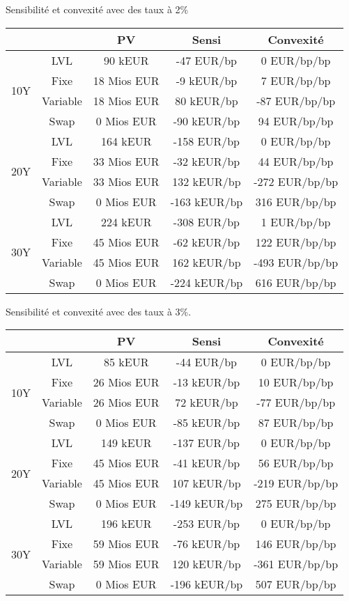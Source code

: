 \documentclass{beamer}
\begin{document}
\begin{frame}{Sensibilité et convexité avec des taux à 2\%}
\small
\begin{tabular}{|c|c|c|c|c|}
\hline
&&PV&Sensi&Convexité  \\ 
\hline
\multirow{4}{*}{10Y}&LVL& 90 kEUR &  -47 EUR/bp & 0 EUR/bp/bp \\ 
&Fixe& 18 Mios EUR &  -9 kEUR/bp & 7 EUR/bp/bp \\ 
&Variable& 18 Mios EUR & 80 kEUR/bp & -87 EUR/bp/bp \\ 
&Swap& 0 Mios EUR & -90 kEUR/bp & 94 EUR/bp/bp \\ 
\hline
\multirow{4}{*}{20Y}&LVL& 164 kEUR &  -158 EUR/bp & 0 EUR/bp/bp \\ 
&Fixe& 33 Mios EUR &  -32 kEUR/bp & 44 EUR/bp/bp \\ 
&Variable& 33 Mios EUR & 132 kEUR/bp & -272 EUR/bp/bp \\ 
&Swap& 0 Mios EUR & -163 kEUR/bp & 316 EUR/bp/bp \\ 
\hline
\multirow{4}{*}{30Y}&LVL& 224 kEUR &  -308 EUR/bp & 1 EUR/bp/bp \\ 
&Fixe& 45 Mios EUR &  -62 kEUR/bp & 122 EUR/bp/bp \\ 
&Variable& 45 Mios EUR & 162 kEUR/bp & -493 EUR/bp/bp \\ 
&Swap& 0 Mios EUR & -224 kEUR/bp & 616 EUR/bp/bp \\ 
\hline
\end{tabular}
\normalsize
\end{frame}

\begin{frame}{Sensibilité et convexité avec des taux  à 3\%.}
\small 
\begin{tabular}{|c|c|c|c|c|}
\hline
&&PV&Sensi&Convexité  \\ 
\hline
\multirow{4}{*}{10Y}&LVL& 85 kEUR &  -44 EUR/bp & 0 EUR/bp/bp \\ 
&Fixe& 26 Mios EUR &  -13 kEUR/bp & 10 EUR/bp/bp \\ 
&Variable& 26 Mios EUR & 72 kEUR/bp & -77 EUR/bp/bp \\ 
&Swap& 0 Mios EUR & -85 kEUR/bp & 87 EUR/bp/bp \\ 
\hline
\multirow{4}{*}{20Y}&LVL& 149 kEUR &  -137 EUR/bp & 0 EUR/bp/bp \\ 
&Fixe& 45 Mios EUR &  -41 kEUR/bp & 56 EUR/bp/bp \\ 
&Variable& 45 Mios EUR & 107 kEUR/bp & -219 EUR/bp/bp \\ 
&Swap& 0 Mios EUR & -149 kEUR/bp & 275 EUR/bp/bp \\ 
\hline
\multirow{4}{*}{30Y}&LVL& 196 kEUR &  -253 EUR/bp & 0 EUR/bp/bp \\ 
&Fixe& 59 Mios EUR &  -76 kEUR/bp & 146 EUR/bp/bp \\ 
&Variable& 59 Mios EUR & 120 kEUR/bp & -361 EUR/bp/bp \\ 
&Swap& 0 Mios EUR & -196 kEUR/bp & 507 EUR/bp/bp \\ 
\hline
\end{tabular}
\normalsize
\end{frame}
\end{document}
